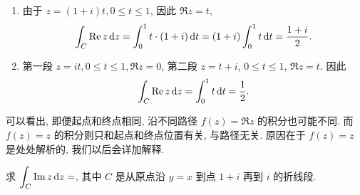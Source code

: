 \begin{solution}
	\begin{enumerate}
		\item 由于 $z=(1+i)t,0\le t\le 1$, 因此 $\Re z=t$,
			\[
				\int_C\operatorname{Re} z\,\mathrm{d} z=\int_0^1t\cdot(1+i)\,\mathrm{d} t
				=(1+i)\int_0^1t\,\mathrm{d} t
				=\frac{1+i}2.
			\]
		\item 第一段 $z=it,0\le t\le 1, \Re z=0$,
			第二段 $z=t+i$, $0\le t\le 1$, $\Re z=t$. 因此
			\[
				\int_C\operatorname{Re} z\,\mathrm{d} z=\int_0^1 t\,\mathrm{d} t=\frac12.
			\]
	\end{enumerate}
\end{solution}

可以看出, 即便起点和终点相同, 沿不同路径 $f(z)=\Re z$ 的积分也可能不同.
而 $f(z)=z$ 的积分则只和起点和终点位置有关, 与路径无关.
原因在于 $f(z)=z$ 是处处解析的, 我们以后会详加解释.

\begin{exercise}
	求 $\displaystyle\int_C\operatorname{Im} z\,\mathrm{d} z=$\fillblank[3cm][2mm]{}, 其中 $C$ 是从原点沿 $y=x$ 到点 $1+i$ 再到 $i$ 的折线段.
\end{exercise}

